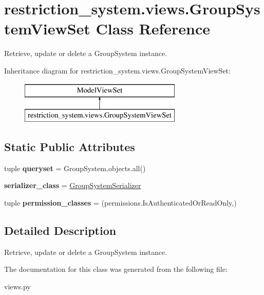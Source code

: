 \hypertarget{classrestriction__system_1_1views_1_1GroupSystemViewSet}{}\section{restriction\+\_\+system.\+views.\+Group\+System\+View\+Set Class Reference}
\label{classrestriction__system_1_1views_1_1GroupSystemViewSet}


Retrieve, update or delete a Group\+System instance.  


Inheritance diagram for restriction\+\_\+system.\+views.\+Group\+System\+View\+Set\+:\begin{figure}[H]
\begin{center}
\leavevmode
\includegraphics[height=2.000000cm]{classrestriction__system_1_1views_1_1GroupSystemViewSet}
\end{center}
\end{figure}
\subsection*{Static Public Attributes}
\begin{DoxyCompactItemize}
\item 
\hypertarget{classrestriction__system_1_1views_1_1GroupSystemViewSet_a488f9e6632875dc55abf3c5ca87f6302}{}tuple {\bfseries queryset} = Group\+System.\+objects.\+all()\label{classrestriction__system_1_1views_1_1GroupSystemViewSet_a488f9e6632875dc55abf3c5ca87f6302}

\item 
\hypertarget{classrestriction__system_1_1views_1_1GroupSystemViewSet_a2c4bc600828b4e92f3896af4dff89eb2}{}{\bfseries serializer\+\_\+class} = \hyperlink{classrestriction__system_1_1serializers_1_1GroupSystemSerializer}{Group\+System\+Serializer}\label{classrestriction__system_1_1views_1_1GroupSystemViewSet_a2c4bc600828b4e92f3896af4dff89eb2}

\item 
\hypertarget{classrestriction__system_1_1views_1_1GroupSystemViewSet_acf70d44ad5ffd77a937bd960d276c0bc}{}tuple {\bfseries permission\+\_\+classes} = (permissions.\+Is\+Authenticated\+Or\+Read\+Only,)\label{classrestriction__system_1_1views_1_1GroupSystemViewSet_acf70d44ad5ffd77a937bd960d276c0bc}

\end{DoxyCompactItemize}


\subsection{Detailed Description}
Retrieve, update or delete a Group\+System instance. 



The documentation for this class was generated from the following file\+:\begin{DoxyCompactItemize}
\item 
views.\+py\end{DoxyCompactItemize}

